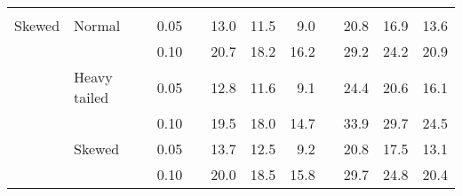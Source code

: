 \begin{table}[ht]
\begin{scriptsize}
\begin{center}
\begin{tabular}{ll p{.1cm} c p{.1cm} rrr p{.1cm} rrr}
&&&&&&&&&&&\\
Skewed       & Normal       && 0.05 &&   13.0 & 11.5 & 9.0 &   & 20.8 & 16.9 & 13.6 \\ 
             &              && 0.10 &&   20.7 & 18.2 & 16.2 &   & 29.2 & 24.2 & 20.9 \\ 
             & Heavy tailed && 0.05 &&   12.8 & 11.6 & 9.1 &   & 24.4 & 20.6 & 16.1 \\ 
             &              && 0.10 &&   19.5 & 18.0 & 14.7 &   & 33.9 & 29.7 & 24.5 \\ 
             & Skewed       && 0.05 &&   13.7 & 12.5 & 9.2 &   & 20.8 & 17.5 & 13.1 \\ 
             &              && 0.10 &&   20.0 & 18.5 & 15.8 &   & 29.7 & 24.8 & 20.4 \\ 


\end{tabular}
\end{center}
\end{scriptsize}
\end{table}
